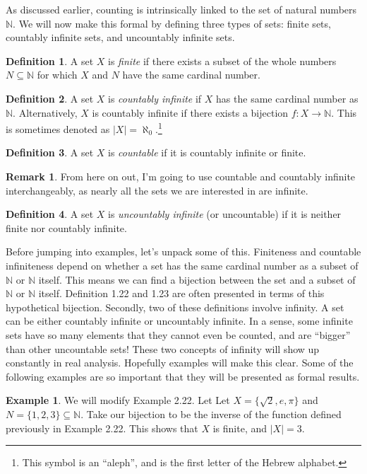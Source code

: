 \documentclass{article}
\newcommand{\N}{\mathbb{N}}
\theoremstyle{definition}
\newtheorem{definition}{Definition}[section]
\newtheorem{example}{Example}[section]
\newtheorem{remark}{Remark}[section]
\begin{document}
	As discussed earlier, counting is intrinsically linked to the set of natural numbers $ \N $. We will now make this formal by defining three types of sets: finite sets, countably infinite sets, and uncountably infinite sets.
	\begin{definition}\label{def}
		A set $ X $ is \textit{\color{red}finite} if there exists a subset of the whole numbers $ N\subseteq \N $ for which $ X $ and $ N $ have the same cardinal number.
	\end{definition} 
	\begin{definition}\label{def}
		A set $ X $ is \textit{\color{red}countably infinite} if $ X $ has the same cardinal number as $ \N $. Alternatively, $ X $ is countably infinite if there exists a bijection $ f:X\to\N $. This is sometimes denoted as $ |X|=\aleph_0 $.\footnote{This symbol is an ``aleph'', and is the first letter of the Hebrew alphabet.} 
	\end{definition}
	\begin{definition}\label{def}
		A set $ X $ is \textit{\color{red}countable} if it is countably infinite or finite.
	\end{definition}
	\begin{remark}
		From here on out, I'm going to use countable and countably infinite interchangeably, as nearly all the sets we are interested in are infinite.  
	\end{remark}
	\begin{definition}\label{def}
		A set $ X $ is  \textit{\color{red}uncountably infinite} (or uncountable) if it is neither finite nor countably infinite.
	\end{definition}
	Before jumping into examples, let's unpack some of this. Finiteness and countable infiniteness depend on whether a set has the same cardinal number as a subset of $ \N $ or $ \N $ itself. This means we can find a bijection between the set and a subset of $ \N $ or $ \N $ itself. Definition 1.22 and 1.23 are often presented in terms of this hypothetical bijection. Secondly, two of these definitions involve infinity. A set can be either countably infinite or uncountably infinite. In a sense, some infinite sets have so many elements that they cannot even be counted, and are ``bigger'' than other uncountable sets! These two concepts of infinity will show up constantly in real analysis. Hopefully examples will make this clear. Some of the following examples are so important that they will be presented as formal results. 
	\begin{example}
		We will modify Example 2.22. Let Let $ X=\{\sqrt{2},e,\pi\} $ and $ N=\{1,2,3\}\subseteq \N$. Take our bijection to be the inverse of the function defined previously in Example 2.22. This shows that $ X $ is finite, and $ |X|=3 $. 
	\end{example}
\end{document}
